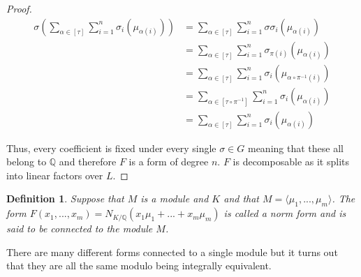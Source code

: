 \documentclass{article}
\newtheorem{definition}{Definition}[section]
\newcommand{\mbb}[1]{\mathbb{#1}}
\numberwithin{equation}{section}
\begin{document}
\begin{proof}
\begin{align*}
    \sigma(\sum_{\alpha \in [\tau]} \sum_{i=1}^n \sigma_i(\mu_{\alpha(i)})) &= \sum_{\alpha \in [\tau]} \sum_{i=1}^n \sigma \sigma_i(\mu_{\alpha(i)})  \\
    &= \sum_{\alpha \in [\tau]} \sum_{i=1}^n \sigma_{\pi(i)}(\mu_{\alpha(i)}) \\
    &= \sum_{\alpha \in [\tau]} \sum_{i=1}^n \sigma_{i}(\mu_{\alpha \circ \pi^{-1}(i)}) \\ 
    &= \sum_{\alpha \in [\tau \circ \pi^{-1}]} \sum_{i=1}^n \sigma_{i}(\mu_{\alpha (i)}) \\
    &= \sum_{\alpha \in [\tau]} \sum_{i=1}^n \sigma_i(\mu_{\alpha(i)})
\end{align*}

Thus, every coefficient is fixed under every single $\sigma \in G$ meaning that these all belong to $\mbb Q$ and therefore $F$ is a form of degree $n$. $F$ is decomposable as it splits into linear factors over $L$.
\end{proof}


\begin{definition}
    Suppose that $M$ is a module and $K$ and that $M = \langle \mu_1, ..., \mu_m\rangle$. The form $F(x_1, ..., x_m) = N_{K / \mbb Q}(x_1 \mu_1 + ... + x_m \mu_m)$ is called a norm form and is said to be connected to the module $M$.
\end{definition}
There are many different forms connected to a single module but it turns out that they are all the same modulo being integrally equivalent.
\end{document}
